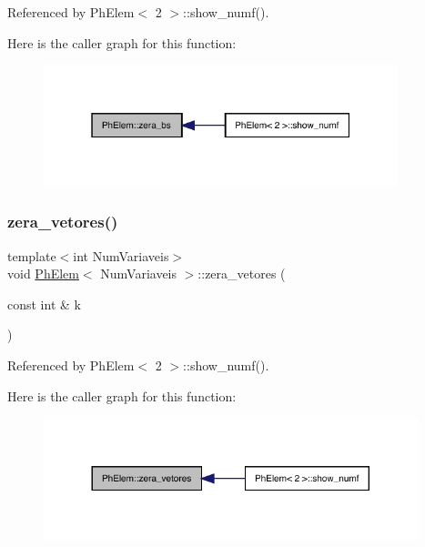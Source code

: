 Referenced by Ph\+Elem$<$ 2 $>$\+::show\+\_\+numf().

Here is the caller graph for this function\+:
\nopagebreak
\begin{figure}[H]
\begin{center}
\leavevmode
\includegraphics[width=292pt]{classPhElem_a55ef84501df0d4e8aec6d49846e21237_icgraph}
\end{center}
\end{figure}
\mbox{\label{classPhElem_a46f2be4d83b5c7c2cc9c6699f1fe977c}} 
\subsubsection{\texorpdfstring{zera\+\_\+vetores()}{zera\_vetores()}}
{\footnotesize\ttfamily template$<$int Num\+Variaveis$>$ \\
void \hyperlink{classPhElem}{Ph\+Elem}$<$ Num\+Variaveis $>$\+::zera\+\_\+vetores (\begin{DoxyParamCaption}\item[{const int \&}]{k }\end{DoxyParamCaption})}



Referenced by Ph\+Elem$<$ 2 $>$\+::show\+\_\+numf().

Here is the caller graph for this function\+:
\nopagebreak
\begin{figure}[H]
\begin{center}
\leavevmode
\includegraphics[width=308pt]{classPhElem_a46f2be4d83b5c7c2cc9c6699f1fe977c_icgraph}
\end{center}
\end{figure}


